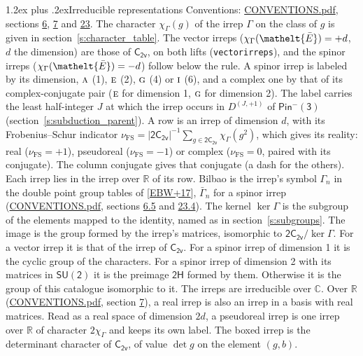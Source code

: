 \documentclass[10pt,a4paper]{article}
\makeatletter
\renewcommand\section{\@startsection{section}{1}{\z@}{-3ex plus -1ex minus -.2ex}%
  {1.2ex plus .2ex}{\normalfont\large\sffamily\bfseries\color{parttitle}}}
\numberwithin{equation}{section}
\newcommand{\eltfont}[1]{{\let\sigma\eltsigma\mathelt{#1}}}
\newcommand{\grp}[1]{\mathsf{#1}}
\newcommand{\irr}[1]{\text{\normalfont\scshape #1}}
\newcommand{\elt}[1]{\eltfont{#1}}
\newcommand{\irrJp}[2]{D^{(#1,#2)}}
\newcommand{\irchar}[1]{\chi_{#1}}
\newcommand{\fsind}{\nu_{\mathrm{FS}}}
\newcommand{\barred}[1]{\bar{#1}}
\makeatother
\begin{document}
\section{Irreducible representations}\label{s:irreps}
Conventions: \href{../../CONVENTIONS.pdf}{CONVENTIONS.pdf}, sections \href{../../../rotation/CONVENTIONS.pdf\#conv.6}{6}, \href{../../../rotation/CONVENTIONS.pdf\#conv.7}{7} and \href{../../CONVENTIONS.pdf\#conv.23}{23}.
\leavevmode\label{n:function.character}\label{n:irrep.Gamma}The character $\irchar{\Gamma}(g)$ of the irrep $\Gamma$ on the class of $g$ is given in section~\ref{s:character_table}. \label{n:index.dimension}The vector irreps ($\irchar{\Gamma}(\elt{\barred{E}}) = +d$, $d$ the dimension) are those of \href{../../../rotation/data/pdf/C2v.pdf}{$\grp{C_{2v}}$}, on both lifts (\texttt{vectorirreps}), and the spinor irreps ($\irchar{\Gamma}(\elt{\barred{E}}) = -d$) follow below the rule. A spinor irrep is labeled by its dimension, $\irr{a}$ (1), $\irr{e}$ (2), $\irr{g}$ (4) or $\irr{i}$ (6), and a complex one by that of its complex-conjugate pair ($\irr{e}$ for dimension 1, $\irr{g}$ for dimension 2). The label carries the least half-integer $J$ at which the irrep occurs in $\irrJp{J}{+1}$ of $\grp{Pin^{-}(3)}$ (section~\ref{s:subduction_parent}).
\leavevmode\label{n:index.frobenius}\label{n:head.irrep}\label{n:head.reality}A row is an irrep of dimension $d$, with its Frobenius--Schur indicator $\fsind = |\grp{2C_{2v}}|^{-1}\allowbreak\sum_{g\in\grp{2C_{2v}}}\irchar{\Gamma}(g^2)$, which gives its reality: real ($\fsind = +1$), pseudoreal ($\fsind = -1$) or complex ($\fsind = 0$, paired with its conjugate). \label{n:head.conjugate}The column conjugate gives that conjugate (a dash for the others). \label{n:head.over.real}Each irrep lies in the irrep over $\mathbb{R}$ of its row. \label{n:head.bilbao}\label{n:irrep.alias.gamma}Bilbao is the irrep's symbol $\Gamma_n$ in the double point group tables of [\href{../../../REFERENCES.pdf\#ref.EBW+17}{EBW+17}], $\bar{\Gamma}_n$ for a spinor irrep (\href{../../CONVENTIONS.pdf}{CONVENTIONS.pdf}, sections \href{../../../rotation/CONVENTIONS.pdf\#conv.6.5}{6.5} and \href{../../CONVENTIONS.pdf\#conv.23.4}{23.4}). \label{n:head.kernel}The kernel $\ker\Gamma$ is the subgroup of the elements mapped to the identity, named as in section~\ref{s:subgroups}. \label{n:head.image}The image is the group formed by the irrep's matrices, isomorphic to $\grp{2C_{2v}}/\ker\Gamma$. For a vector irrep it is that of the irrep of \href{../../../rotation/data/pdf/C2v.pdf}{$\grp{C_{2v}}$}. For a spinor irrep of dimension 1 it is the cyclic group of the characters. For a spinor irrep of dimension 2 with its matrices in $\grp{SU(2)}$ it is the preimage $\grp{2H}$ formed by them. Otherwise it is the group of this catalogue isomorphic to it. The irreps are irreducible over $\mathbb{C}$. Over $\mathbb{R}$ (\href{../../CONVENTIONS.pdf}{CONVENTIONS.pdf}, section \href{../../../rotation/CONVENTIONS.pdf\#conv.7}{7}), a real irrep is also an irrep in a basis with real matrices. Read as a real space of dimension $2d$, a pseudoreal irrep is one irrep over $\mathbb{R}$ of character $2\irchar{\Gamma}$ and keeps its own label. \label{n:mark.determinant}The boxed irrep is the determinant character of \href{../../../rotation/data/pdf/C2v.pdf}{$\grp{C_{2v}}$}, of value $\det g$ on the element $(g, b)$.
\end{document}
